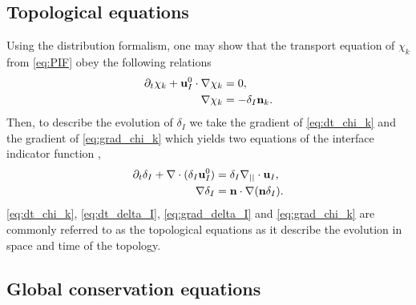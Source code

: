 \subsection{Topological equations}

Using the distribution formalism, one may show that the transport equation of $\chi_k$ from \ref{eq:PIF} obey the following relations \citep{drew1983mathematical} 
\begin{align}
    \partial_t \chi_k
    + \textbf{u}_I^0 \cdot \mathbf{\nabla} \chi_k
    &= 0,
    \label{eq:dt_chi_k}\\
    \label{eq:grad_chi_k}
    \mathbf{\nabla} \chi_k
    &= - \delta_I \textbf{n}_k. 
\end{align}
Then, to describe the evolution of $\delta_I$ we take the gradient of \ref{eq:dt_chi_k} and the gradient of \ref{eq:grad_chi_k} which yields two equations of the interface indicator function \citep{morel2007surface},
\begin{align}
    \partial_t \delta_I
    + \mathbf{\nabla}\cdot (\delta_I \textbf{u}_I^0)
    &= \delta_I \mathbf{\nabla}_{||}\cdot \textbf{u}_I,
    \label{eq:dt_delta_I}\\
    \mathbf{\nabla}\delta_I 
    &= \textbf{n} \cdot \mathbf{\nabla} (\textbf{n} \delta_I).
    \label{eq:grad_delta_I}
\end{align}
\ref{eq:dt_chi_k}, \ref{eq:dt_delta_I}, \ref{eq:grad_delta_I} and \ref{eq:grad_chi_k} are commonly referred to as the topological equations as it describe the evolution in space and time of the topology.


\subsection{Global conservation equations}

